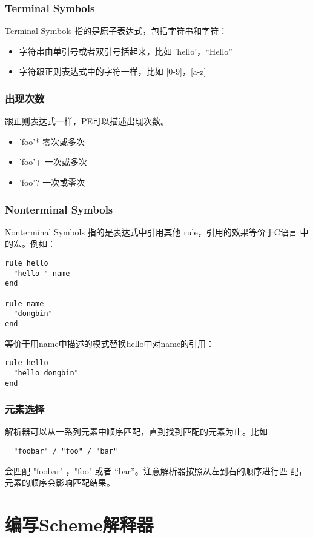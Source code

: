 \documentclass{article}
\begin{document}
\subsubsection{Terminal Symbols}
Terminal Symbols 指的是原子表达式，包括字符串和字符：
\begin{itemize}
\item 字符串由单引号或者双引号括起来，比如 'hello'，“Hello”
\item 字符跟正则表达式中的字符一样，比如 [0-9]，[a-z]
\end{itemize}

\subsubsection{出现次数}
跟正则表达式一样，PE可以描述出现次数。
\begin{itemize}
\item 'foo'* 零次或多次
\item 'foo'+ 一次或多次
\item 'foo'? 一次或零次
\end{itemize}

\subsubsection{Nonterminal Symbols}
Nonterminal Symbols 指的是表达式中引用其他 rule，引用的效果等价于C语言
中的宏。例如：

\begin{lstlisting}
rule hello
  "hello " name
end

rule name
  "dongbin"
end
\end{lstlisting}

等价于用name中描述的模式替换hello中对name的引用：

\begin{lstlisting}
rule hello
  "hello dongbin"
end
\end{lstlisting}

\subsubsection{元素选择}
解析器可以从一系列元素中顺序匹配，直到找到匹配的元素为止。比如
\begin{lstlisting}
  "foobar" / "foo" / "bar"
\end{lstlisting}
会匹配 "foobar" ，"foo" 或者 “bar”。注意解析器按照从左到右的顺序进行匹
配，元素的顺序会影响匹配结果。

\section{编写Scheme解释器}
\end{document}
